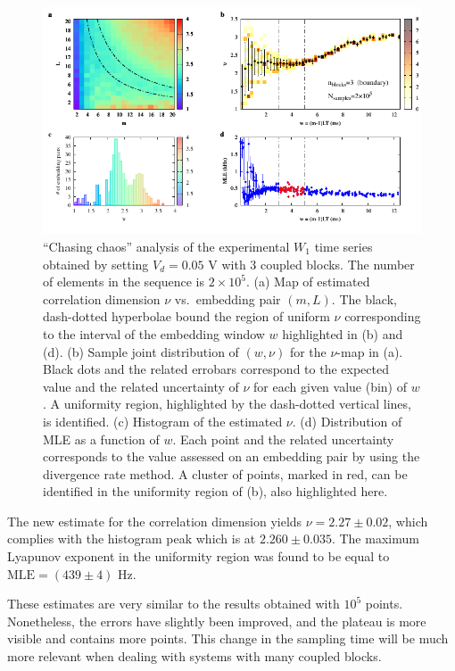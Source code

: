 \begin{figure}[ht!]
    \centering
    \includegraphics[width=\linewidth]{../blocks/3_blocks/edge/2e5_points/plots/chaos_low.pdf}
    \caption{``Chasing chaos'' analysis of the experimental $W_1$ time series obtained by setting $V_d=0.05$ V with 3 coupled blocks.
    The number of elements in the sequence is $2\times10^5$.
    (a) Map of estimated correlation dimension $\nu$ vs.\ embedding pair $(m, L)$.
    The black, dash-dotted hyperbolae bound the region of uniform $\nu$ corresponding to the interval of the
    embedding window $w$ highlighted in (b) and (d).
    (b) Sample joint distribution of $(w,\nu)$ for the $\nu$-map in (a).
    Black dots and the related errobars correspond to the expected value and the related uncertainty of $\nu$
    for each given value (bin) of $w$. A uniformity region, highlighted by the dash-dotted vertical lines,
    is identified. (c) Histogram of the estimated $\nu$. (d) Distribution of MLE as a function of $w$. Each point and the related
    uncertainty corresponds to the value assessed on an embedding pair by using the divergence rate method.
    A cluster of points, marked in red, can be identified in the uniformity region of (b), also highlighted here.
    }\label{fig:3 blocks chaos boundary 2e5}
\end{figure}

The new estimate for the correlation dimension yields $\nu=2.27\pm0.02$, which complies with the
histogram peak which is at $2.260\pm0.035$. The maximum Lyapunov exponent in the uniformity region was found 
to be equal to $\text{MLE}=(439\pm4)$ Hz.

These estimates are very similar to the results obtained with $10^5$ points.
Nonetheless, the errors have slightly been improved, and the plateau is more visible and contains
more points. This change in the sampling time will be much more relevant when dealing with systems
with many coupled blocks.


